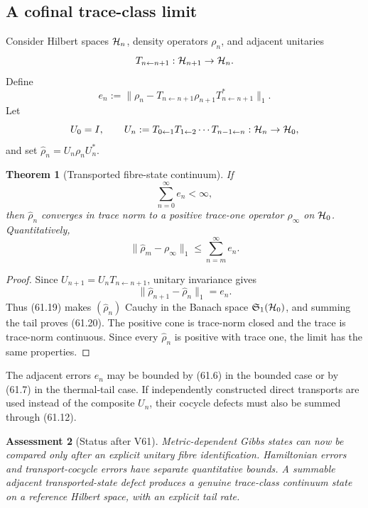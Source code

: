 \documentclass[11pt]{article}
\newtheorem{theorem}{Theorem}[section]
\newtheorem{assessment}[theorem]{Assessment}
\theoremstyle{remark}
\begin{document}
\subsection{A cofinal trace-class limit}

Consider Hilbert spaces \({\cal H}_n\), density operators \(\rho_n\),
and adjacent unitaries
\[
 T_{n\leftarrow n+1}:{\cal H}_{n+1}\to{\cal H}_n.
\]
Define
\begin{equation}
 e_n:=
 \|\rho_n-
 T_{n\leftarrow n+1}\rho_{n+1}
 T_{n\leftarrow n+1}^*\|_1.                       \tag{61.18}
\end{equation}
Let
\[
 U_0=I,\qquad
 U_n:=T_{0\leftarrow1}T_{1\leftarrow2}\cdots
      T_{n-1\leftarrow n}:{\cal H}_n\to{\cal H}_0,
\]
and set \(\widehat\rho_n=U_n\rho_nU_n^*\).

\begin{theorem}[Transported fibre-state continuum]
\label{thm:v12v61-limit}
If
\begin{equation}
                         \sum_{n=0}^\infty e_n<\infty,        \tag{61.19}
\end{equation}
then \(\widehat\rho_n\) converges in trace norm to a positive
trace-one operator \(\rho_\infty\) on \({\cal H}_0\).  Quantitatively,
\begin{equation}
 \|\widehat\rho_m-\rho_\infty\|_1
 \leq\sum_{n=m}^\infty e_n.                       \tag{61.20}
\end{equation}
\end{theorem}

\begin{proof}
Since
\(U_{n+1}=U_nT_{n\leftarrow n+1}\), unitary invariance gives
\[
 \|\widehat\rho_{n+1}-\widehat\rho_n\|_1=e_n.
\]
Thus (61.19) makes \((\widehat\rho_n)\) Cauchy in the Banach space
\({\mathfrak S}_1({\cal H}_0)\), and summing the tail proves
(61.20).  The positive cone is trace-norm closed and the trace is
trace-norm continuous.  Since every \(\widehat\rho_n\) is positive
with trace one, the limit has the same properties.
\end{proof}

The adjacent errors \(e_n\) may be bounded by (61.6) in the bounded
case or by (61.7) in the thermal-tail case.  If independently
constructed direct transports are used instead of the composite
\(U_n\), their cocycle defects must also be summed through
(61.12).

\begin{assessment}[Status after V61]
\label{ass:v12v61-status}
Metric-dependent Gibbs states can now be compared only after an
explicit unitary fibre identification.  Hamiltonian errors and
transport-cocycle errors have separate quantitative bounds.  A
summable adjacent transported-state defect produces a genuine
trace-class continuum state on a reference Hilbert space, with an
explicit tail rate.
\end{assessment}
\end{document}
